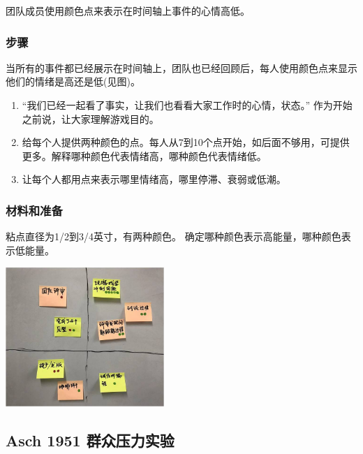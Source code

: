 团队成员使用颜色点来表示在时间轴上事件的心情高低。

\hypertarget{ux6b65ux9aa4-2}{%
\subsubsection{步骤}\label{ux6b65ux9aa4-2}}

当所有的事件都已经展示在时间轴上，团队也已经回顾后，每人使用颜色点来显示他们的情绪是高还是低(见图)。

\begin{enumerate}
\tightlist
\item
  ``我们已经一起看了事实，让我们也看看大家工作时的心情，状态。''
  作为开始之前说，让大家理解游戏目的。
\item
  给每个人提供两种颜色的点。每人从7到10个点开始，如后面不够用，可提供更多。解释哪种颜色代表情绪高，哪种颜色代表情绪低。
\item
  让每个人都用点来表示哪里情绪高，哪里停滞、衰弱或低潮。
\end{enumerate}

\hypertarget{ux6750ux6599ux548cux51c6ux5907-2}{%
\subsubsection{材料和准备}\label{ux6750ux6599ux548cux51c6ux5907-2}}

粘点直径为1/2到3/4英寸，有两种颜色。
确定哪种颜色表示高能量，哪种颜色表示低能量。


\includegraphics[width=6cm]{便利贴1.jpg}

\hypertarget{asch-1951-ux7fa4ux4f17ux538bux529bux5b9eux9a8c}{%
\subsection{Asch 1951
群众压力实验}\label{asch-1951-ux7fa4ux4f17ux538bux529bux5b9eux9a8c}}


